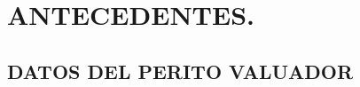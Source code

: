 \documentclass[10pt,letter]{report}
\begin{document}
\def\sectionautorefname{Inciso}
\def\subsectionautorefname{Inciso}
\def\subsubsectionautorefname{Inciso}


\thispagestyle{plain}
%

\newpage
\setcounter{page}{1}
\thispagestyle{fancy}
\tableofcontents

\newpage


\chapter{ANTECEDENTES.}\label{cap:1}
\thispagestyle{fancy}
\section{DATOS DEL PERITO VALUADOR}\label{sec:a}
\end{document}

